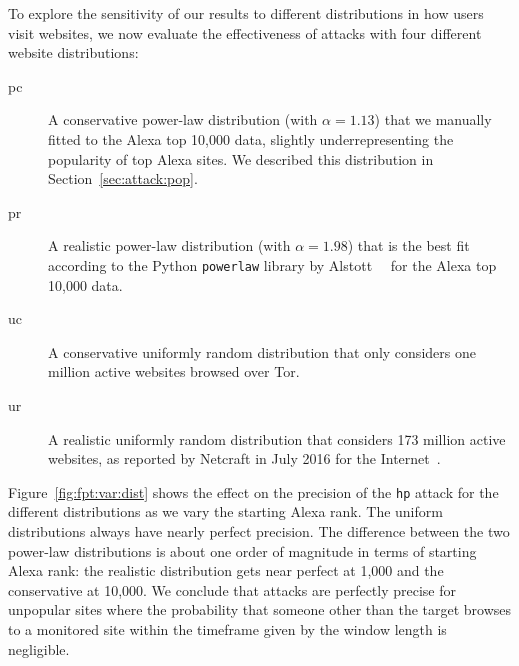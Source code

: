 To explore the sensitivity of our results to different distributions in
how users visit websites, we now evaluate the effectiveness of \name
attacks with four different website distributions:
\begin{description}
	\item[pc] A conservative power-law distribution
	(with $\alpha=1.13$)
	that we manually fitted to the Alexa top 10,000 data,
	slightly underrepresenting the popularity of top Alexa sites.
	We described this distribution in Section~\ref{sec:attack:pop}.
	\item[pr] A realistic power-law distribution
	(with $\alpha=1.98$)
	that is the best fit according to
	the Python {\tt powerlaw} library by Alstott~\ea~\cite{Alstott2014a} for the Alexa
	top 10,000 data.
	\item[uc] A conservative uniformly random distribution that
	only considers one million active websites browsed over Tor.
	\item[ur] A realistic uniformly random distribution that
          considers 173 million active websites, as reported by Netcraft
          in July 2016 for the Internet~\cite{numberofwebsites}.
\end{description}
Figure~\ref{fig:fpt:var:dist} shows the effect on the precision of the
\texttt{hp} attack for the different distributions as we vary the starting
Alexa rank. The uniform distributions always have nearly perfect precision.
The difference between the two power-law distributions is about one order of
magnitude in terms of starting Alexa rank: the realistic distribution gets
near perfect at 1,000 and the conservative at 10,000.
We conclude that \name attacks are perfectly precise for unpopular sites
where the probability that someone other than the target browses to a monitored
site within the timeframe given by the window length is negligible.
